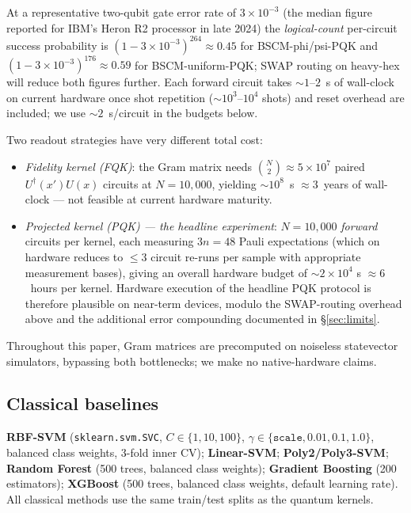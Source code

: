 \documentclass[pdflatex,sn-mathphys]{sn-jnl}
\theoremstyle{plain}
\theoremstyle{remark}
\theoremstyle{definition}
\begin{document}
At a representative two-qubit gate error rate of $3\!\times\!10^{-3}$ (the median figure reported for IBM's Heron R2 processor in late 2024) the \emph{logical-count} per-circuit success probability is $(1-3\!\times\!10^{-3})^{264}\!\approx\!0.45$ for BSCM-phi/psi-PQK and $(1-3\!\times\!10^{-3})^{176}\!\approx\!0.59$ for BSCM-uniform-PQK; SWAP routing on heavy-hex will reduce both figures further.  Each forward circuit takes $\sim\!1$--$2$~s of wall-clock on current hardware once shot repetition ($\sim\!10^3$--$10^4$ shots) and reset overhead are included; we use $\sim 2$~s/circuit in the budgets below.

Two readout strategies have very different total cost:
\begin{itemize}
\item[(i)] \emph{Fidelity kernel (FQK)}: the Gram matrix needs $\binom{N}{2}\!\approx\!5\!\times\!10^{7}$ paired $U^{\dagger}(x')U(x)$ circuits at $N=10{,}000$, yielding $\sim\!10^{8}$~s $\approx 3$~years of wall-clock --- not feasible at current hardware maturity.
\item[(ii)] \emph{Projected kernel (PQK) --- the headline experiment}: $N=10{,}000$ \emph{forward} circuits per kernel, each measuring $3n=48$ Pauli expectations (which on hardware reduces to $\le 3$ circuit re-runs per sample with appropriate measurement bases), giving an overall hardware budget of $\sim\!2\times 10^{4}$ s $\approx 6$~hours per kernel.  Hardware execution of the headline PQK protocol is therefore plausible on near-term devices, modulo the SWAP-routing overhead above and the additional error compounding documented in \S\ref{sec:limits}.
\end{itemize}
Throughout this paper, Gram matrices are precomputed on noiseless statevector simulators, bypassing both bottlenecks; we make no native-hardware claims.

\subsection{Classical baselines}
\textbf{RBF-SVM} (\texttt{sklearn.svm.SVC}, $C\in \{1,10,100\}$, $\gamma\in \{\texttt{scale}, 0.01, 0.1, 1.0\}$, balanced class weights, 3-fold inner CV); \textbf{Linear-SVM}; \textbf{Poly2/Poly3-SVM}; \textbf{Random Forest} (500 trees, balanced class weights); \textbf{Gradient Boosting} (200 estimators); \textbf{XGBoost} \cite{chen2016} (500 trees, balanced class weights, default learning rate). All classical methods use the same train/test splits as the quantum kernels.
\end{document}
